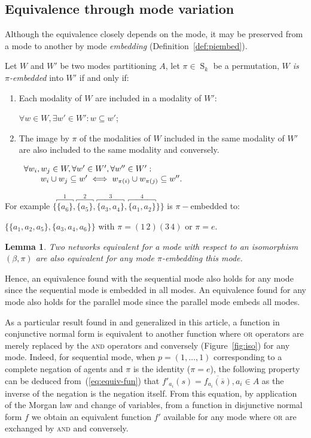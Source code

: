 \documentclass[12pt]{elsarticle}
\newtheorem{lemma}{Lemma}
\newcommand{\gsym}[1]{\operatorname{S}_{#1}}
\renewcommand{\lnot}[1]{\overline{#1}}
\begin{document}
\subsection{Equivalence through mode variation}
Although the equivalence closely depends on the mode, it may be preserved from a mode to another by mode \emph{embedding} (Definition~\ref{def:piembed}).
\begin{definition}
\label{def:piembed}
Let $W$ and $W'$ be two modes partitioning $A$, let $\pi \in \gsym{k}$ be a permutation, \emph{$W$ is $\pi$-embedded} into $W'$ if and only if: 
\begin{enumerate}
\item Each modality of $W$ are included in a modality of $W'$:

$\forall w \in W, \exists w' \in W': w \subseteq w'$; \label{cond1}

\item The image by $\pi$ of the modalities of $W$ included in the same modality of $W'$ are also included to the same modality  and conversely. 

$\begin{array}[t]{l}
\forall w_i, w_j \in W, \forall w'\in W', \forall w'' \in W': \\  \qquad
 w_i \cup w_j \subseteq w' \iff w_{\pi(i)} \cup w_{\pi(j)} \subseteq w''. 
\end{array}$ \label{cond2}
\end{enumerate}
\end{definition} 
For example $\{\overbracket{\{a_6\}}^1,\overbracket{\{a_5\}}^2, \overbracket{\{a_3,a_4\}}^{3},\overbracket{\{a_1,a_2\}}^4 \}\}$ is $\pi-$embedded to:

\noindent
 $\{\{a_1,a_2,a_5\},\{a_3,a_4,a_6\}\}$ with $\pi =(1 \, 2) (3 \, 4)$ or $\pi=e$.

\begin{lemma}
\label{lem:fun-equivalent}
 Two networks equivalent for a mode with respect to an isomorphism $(\beta,\pi)$ are also equivalent for any mode $\pi$-embedding this mode.
\end{lemma}
Hence, an equivalence found with the sequential mode also holds for any mode since the sequential mode is embedded in all modes. An equivalence found for any mode also holds for the parallel mode since the parallel mode embeds all modes.

As a particular result found in \cite{Jarrah2010} and generalized in this article, a function in conjunctive normal form is equivalent to another function where \textsc{or} operators are merely replaced by the \textsc{and} operators and conversely (Figure~\ref{fig:iso}) for any mode. Indeed, 
for sequential mode, when $p=(1,\ldots,1)$ corresponding to a complete negation of agents and $\pi$ is the identity ($\pi=e$), the following property can be deduced from~(\ref{eq:equiv-fun}) that $f'_{a_i}(s)=\lnot{f_{a_i}( \lnot{s})}, a_i \in A$ as the inverse of the negation is the negation itself. From this equation, by application of the Morgan law and change of variables, from a function in disjunctive normal form $f$ we obtain an equivalent function $f'$ available for any mode where \textsc{or} are exchanged by \textsc{and} and conversely. 
\end{document}
